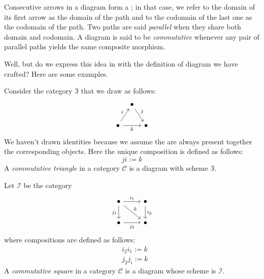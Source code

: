 Consecutive arrows in a diagram form a ; in that case, we
refer to the domain of its first arrow as the domain of the path and
to the codomain of the last one as the codomain of the path. Two paths
are said {\em parallel} when they share both domain and codomain. A
diagram is said to be {\em commutative} whenever any pair of parallel
paths yields the same composite morphism.

Well, but do we express this idea in with the definition of diagram we
have crafted? Here are some examples.

\begin{example}
  Consider the category \(\mathbb{3}\) that we draw as follows:
  \[
    \begin{tikzcd}[column sep=tiny]
      & \bullet \ar["j", dr]  \\
      \bullet \ar["i", ur] \ar["k", rr, swap] & & \bullet
    \end{tikzcd}
  \]
  We haven't drawn identities because we assume the are always present
  together the corresponding objects. Here the unique composition is
  defined as follows:
  \[
    ji := k
  \]
  A {\em commutative triangle} in a category \(\mathcal{C}\) is a diagram
  with scheme \(\mathbb{3}\).
\end{example}

\begin{example}
  Let \(\mathcal{I}\) be the category
  \[
    \begin{tikzcd}
      \bullet \ar["{i_1}", r] \ar["{j_1}", d, swap] \ar["k", dr] & \bullet \ar["i_2", d] \\
      \bullet \ar["{j_2}", r, swap] & \bullet
    \end{tikzcd}
  \]
  where compositions are defined as follows:
  \begin{align*}
    & i_2i_1 := k \\
    & j_2j_i := k
  \end{align*}
  A {\em commutative square} in a category \(\mathcal{C}\) is a diagram
  whose scheme is \(\mathcal{I}\).
\end{example}

